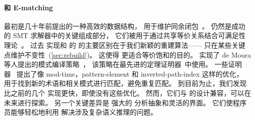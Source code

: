 \paragraph{\Egraphs 和 E-matching}

\Egraph 最初是几十年前提出的一种高效的数据结构，
  用于维护同余闭包~\cite{nelson-oppen-78, kozen-stoc77, nelson}。
\Egraphs 仍然是成功的 SMT 求解器中的关键组成部分，
  它们被用于通过共享等价关系结合可满足性理论~\cite{z3}。 %
过去 \egraph 实现和 \egg 的 \egraph 的主要区别在于我们新颖的重建算法——
  只在某些关键点维护不变性~(\autoref{sec:rebuild})。
这使得 \egg 更适合等价饱和的目的。
\egg 实现了 de Moura 等人提出的模式编译策略~\cite{ematching}，
  该策略在最先进的定理证明器~\cite{z3}中使用。
一些证明器~\cite{z3, simplify} 提出了像 
  mod-time，pattern-element 和 inverted-path-index 这样的优化，
  用于找到新的术语和相关模式进行匹配，避免重复匹配。
  到目前为止，我们发现 \egg 比之前的几个 \egraph 实现更快，即使没有这些优化。
然而，它们与 \egg 的设计兼容，可以在未来进行探索。
  另一个关键差异是 \egg 强大的 \eclass 分析抽象和灵活的界面。
  它们使程序员能够轻松地利用 \egraph 解决涉及复杂语义推理的问题。

